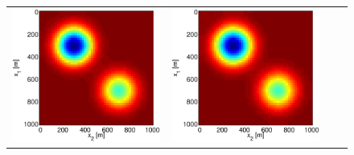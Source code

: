 \documentclass{iopart}
\begin{document}
\begin{figure}
\begin{tabular}{cccc}
\includegraphics[scale=.2]{./figs/2D_exp1_e}&
\includegraphics[scale=.2]{./figs/2D_exp1_f}&

\end{tabular}
\end{figure}
\end{document}
